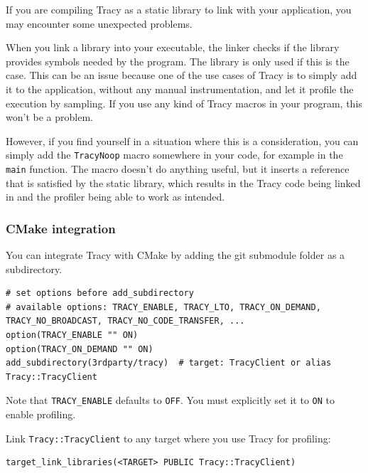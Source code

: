 \documentclass[hidelinks,titlepage,a4paper,twoside]{article}
\begin{document}
If you are compiling Tracy as a static library to link with your application, you may encounter some unexpected problems.

When you link a library into your executable, the linker checks if the library provides symbols needed by the program. The library is only used if this is the case. This can be an issue because one of the use cases of Tracy is to simply add it to the application, without any manual instrumentation, and let it profile the execution by sampling. If you use any kind of Tracy macros in your program, this won't be a problem.

However, if you find yourself in a situation where this is a consideration, you can simply add the \texttt{TracyNoop} macro somewhere in your code, for example in the \texttt{main} function. The macro doesn't do anything useful, but it inserts a reference that is satisfied by the static library, which results in the Tracy code being linked in and the profiler being able to work as intended.

\subsubsection{CMake integration}

You can integrate Tracy with CMake by adding the git submodule folder as a subdirectory.

\begin{lstlisting}
# set options before add_subdirectory
# available options: TRACY_ENABLE, TRACY_LTO, TRACY_ON_DEMAND, TRACY_NO_BROADCAST, TRACY_NO_CODE_TRANSFER, ...
option(TRACY_ENABLE "" ON)
option(TRACY_ON_DEMAND "" ON)
add_subdirectory(3rdparty/tracy)  # target: TracyClient or alias Tracy::TracyClient
\end{lstlisting}

Note that \texttt{TRACY\_ENABLE} defaults to \texttt{OFF}. You must explicitly set it to \texttt{ON} to enable profiling.

Link \texttt{Tracy::TracyClient} to any target where you use Tracy for profiling:

\begin{lstlisting}
target_link_libraries(<TARGET> PUBLIC Tracy::TracyClient)
\end{lstlisting}
\end{document}
